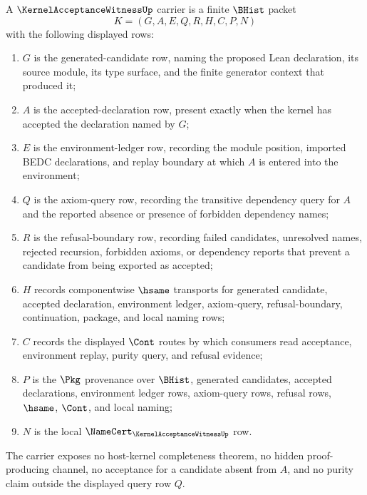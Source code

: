 \begin{definition}
\label{def:kernel-acceptance-witness-carrier}
A $\KernelAcceptanceWitnessUp$ carrier is a finite $\BHist$ packet
$$
K=(G,A,E,Q,R,H,C,P,N)
$$
with the following displayed rows:
\begin{enumerate}
\item $G$ is the generated-candidate row, naming the proposed Lean declaration, its source module, its type surface, and the finite generator context that produced it;
\item $A$ is the accepted-declaration row, present exactly when the kernel has accepted the declaration named by $G$;
\item $E$ is the environment-ledger row, recording the module position, imported BEDC declarations, and replay boundary at which $A$ is entered into the environment;
\item $Q$ is the axiom-query row, recording the transitive dependency query for $A$ and the reported absence or presence of forbidden dependency names;
\item $R$ is the refusal-boundary row, recording failed candidates, unresolved names, rejected recursion, forbidden axioms, or dependency reports that prevent a candidate from being exported as accepted;
\item $H$ records componentwise $\hsame$ transports for generated candidate, accepted declaration, environment ledger, axiom-query, refusal-boundary, continuation, package, and local naming rows;
\item $C$ records the displayed $\Cont$ routes by which consumers read acceptance, environment replay, purity query, and refusal evidence;
\item $P$ is the $\Pkg$ provenance over $\BHist$, generated candidates, accepted declarations, environment ledger rows, axiom-query rows, refusal rows, $\hsame$, $\Cont$, and local naming;
\item $N$ is the local $\NameCert_{\KernelAcceptanceWitnessUp}$ row.
\end{enumerate}
The carrier exposes no host-kernel completeness theorem, no hidden proof-producing channel, no acceptance for a candidate absent from $A$, and no purity claim outside the displayed query row $Q$.
\end{definition}

